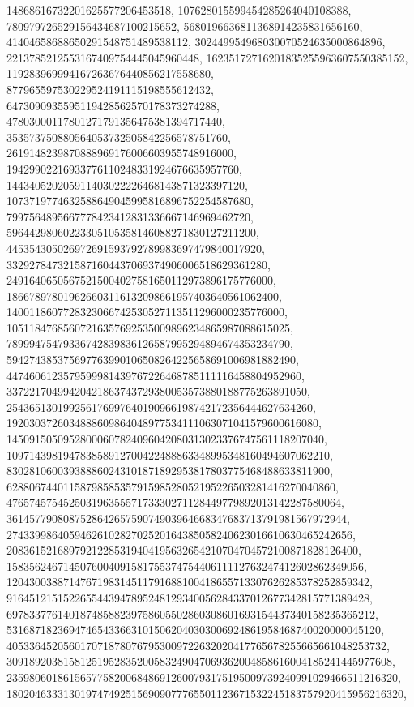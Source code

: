 {{{   14868616732201625577206453518, 107628015599454285264040108388, 
   780979726529156434687100215652, 5680196636811368914235831656160, 
   41404658688650291548751489538112, 302449954968030070524635000864896, 
   2213785212553167409754445045960448, 16235172716201835255963607550385152, 
   119283969994167263676440856217558680, 
   877965597530229524191115198555612432, 
   6473090935595119428562570178373274288, 
   47803000117801271791356475381394717440, 
   353573750880564053732505842256578751760, 
   2619148239870888969176006603955748916000, 
   19429902216933776110248331924676635957760, 
   144340520205911403022226468143871323397120, 
   1073719774632588649045995816896752254587680, 
   7997564895667778423412831336667146969462720, 
   59644298060223305105358146088271830127211200, 
   445354305026972691593792789983697479840017920, 
   3329278473215871604437069374906006518629361280, 
   24916406505675215004027581650112973896175776000, 
   186678978019626603116132098661957403640561062400, 
   1400118607728323066742530527113511296000235776000, 
   10511847685607216357692535009896234865987088615025, 
   78999475479336742839836126587995294894674353234790, 
   594274385375697763990106508264225658691006981882490, 
   4474606123579599981439767226468785111116458804952960, 
   33722170499420421863743729380053573880188775263891050, 
   254365130199256176997640190966198742172356444627634260, 
   1920303726034888609864048977534111063071041579600616080, 
   14509150509528000607824096042080313023376747561118207040, 
   109714398194783858912700422488863348995348160494607062210, 
   830281060039388860243101871892953817803775468488633811900, 
   6288067440115879858535791598528052195226503281416270040860, 
   47657457545250319635557173330271128449779892013142287580064, 
   361457790808752864265759074903964668347683713791981567972944, 
   2743399864059462610282702520164385058240623016610630465242656, 
   20836152168979212285319404195632654210704704572100871828126400, 
   158356246714507600409158175537475440611112763247412602862349056, 
   1204300388714767198314511791688100418655713307626285378252859342, 
   9164512151522655443947895248129340056284337012677342815771389428, 
   69783377614018748588239758605502860308601693154437340158235365212, 
   531687182369474654336631015062040303006924861958468740020000045120, 
   4053364520560170718780767953009722632020417765678255665661048253732, 
   30918920381581251952835200583249047069362004858616004185241445977608, 
   235980601861565775820068486912600793175195009739240991029466511216320, 
   1802046333130197474925156909077765501123671532245183757920415956216320, 
}}}
